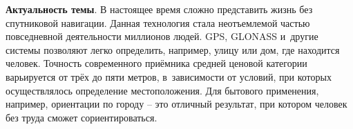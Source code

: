 
\textbf{Актуальность темы}. В настоящее время сложно представить жизнь без спутниковой навигации. Данная технология стала неотъемлемой частью повседневной деятельности миллионов людей. GPS, GLONASS и~другие системы позволяют легко определить, например, улицу или дом, где находится человек. Точность современного приёмника средней ценовой категории варьируется от трёх до пяти метров, в~зависимости от условий, при которых осуществлялось определение местоположения. Для бытового применения, например, ориентации по городу -- это отличный результат, при котором человек без труда сможет сориентироваться. \par